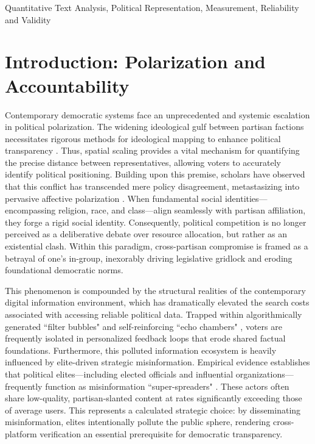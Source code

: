 \documentclass[11pt,letterpaper]{article}
\theoremstyle{plain}
\begin{document}
 Quantitative Text Analysis, Political Representation, Measurement, Reliability and Validity

\section{Introduction: Polarization and Accountability}
Contemporary democratic systems face an unprecedented and systemic escalation in political polarization. The widening ideological gulf between partisan factions necessitates rigorous methods for ideological mapping to enhance political transparency \citep{mccarty2016polarized}. Thus, spatial scaling provides a vital mechanism for quantifying the precise distance between representatives, allowing voters to accurately identify political positioning. Building upon this premise, scholars have observed that this conflict has transcended mere policy disagreement, metastasizing into pervasive affective polarization \citep{iyengar2012affect, mason2015disrespectfully}. When fundamental social identities—encompassing religion, race, and class—align seamlessly with partisan affiliation, they forge a rigid social identity. Consequently, political competition is no longer perceived as a deliberative debate over resource allocation, but rather as an existential clash. Within this paradigm, cross-partisan compromise is framed as a betrayal of one's in-group, inexorably driving legislative gridlock and eroding foundational democratic norms.

This phenomenon is compounded by the structural realities of the contemporary digital information environment, which has dramatically elevated the search costs associated with accessing reliable political data. Trapped within algorithmically generated ``filter bubbles" \citep{pariser2011filter} and self-reinforcing ``echo chambers" \citep{levy2019echo}, voters are frequently isolated in personalized feedback loops that erode shared factual foundations. Furthermore, this polluted information ecosystem is heavily influenced by elite-driven strategic misinformation. Empirical evidence establishes that political elites—including elected officials and influential organizations—frequently function as misinformation ``super-spreaders" \citep{mosleh2022measuring}. These actors often share low-quality, partisan-slanted content at rates significantly exceeding those of average users. This represents a calculated strategic choice: by disseminating misinformation, elites intentionally pollute the public sphere, rendering cross-platform verification an essential prerequisite for democratic transparency.
\end{document}
